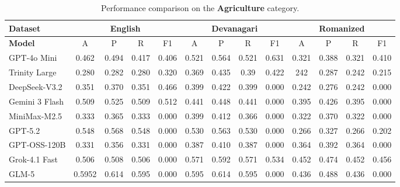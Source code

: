 \documentclass[10pt, a4paper]{article}
\begin{document}
\begin{table}[t]
\centering
\footnotesize
\setlength{\tabcolsep}{4pt}
\renewcommand{\arraystretch}{1.1}

\begin{tabular}{|>{\raggedright\arraybackslash}p{3cm}|c|c|c|c|c|c|c|c|c|c|c|c|}
\hline
\textbf{Dataset}
& \multicolumn{4}{|c|}{\textbf{English}}
& \multicolumn{4}{|c|}{\textbf{Devanagari}}
& \multicolumn{4}{|c|}{\textbf{Romanized}} \\
\hline
\textbf{Model}
& A & P & R & F1 & A & P & R & F1 & A & P & R & F1 \\
\hline
GPT-4o Mini & 0.462& 0.494& 0.417& 0.406& 0.521& 0.564& 0.521& 0.631& 0.321& 0.388& 0.321& 0.410\\
\hline
Trinity Large & 0.280& 0.282& 0.280& 0.320& 0.369& 0.435& 0.39& 0.422& 242& 0.287& 0.242& 0.215\\
\hline
DeepSeek-V3.2 & 0.351& 0.370& 0.351& 0.466& 0.399& 0.422& 0.399& 0.000 & 0.242& 0.276& 0.242& 0.000 \\
\hline
Gemini 3 Flash & 0.509& 0.525& 0.509& 0.512& 0.441& 0.448& 0.441& 0.000 & 0.395& 0.426& 0.395& 0.000 \\
\hline
MiniMax-M2.5 & 0.333& 0.365& 0.333& 0.000 & 0.399& 0.412& 0.366& 0.000 & 0.322& 0.370& 0.322& 0.000 \\
\hline
GPT-5.2 & 0.548& 0.568& 0.548& 0.000 & 0.530& 0.563& 0.530& 0.000 & 0.266& 0.327& 0.266& 0.202\\
\hline
GPT-OSS-120B & 0.331& 0.356& 0.331& 0.000 & 0.387& 0.410& 0.387& 0.000 & 0.364& 0.392& 0.364& 0.000 \\
\hline
Grok-4.1 Fast & 0.506& 0.508& 0.506& 0.000 & 0.571& 0.592& 0.571& 0.534& 0.452& 0.474& 0.452& 0.456\\
\hline
GLM-5 & 0.5952& 0.614& 0.595& 0.000 & 0.595& 0.614& 0.595& 0.000 & 0.436& 0.488& 0.436& 0.000 \\
\hline
\end{tabular}
\caption{Performance comparison on the \textbf{Agriculture} category.}
\label{tab:agriculture_results}
\end{table}
\end{document}

